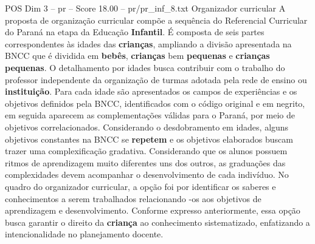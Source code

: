 \begin{textsample}{POS Dim 3 – pr – Score 18.00 – pr/pr\_inf\_8.txt}
Organizador curricular A proposta de organização curricular compõe a sequência do Referencial Curricular do Paraná na etapa da Educação \textbf{Infantil}.
É composta de seis partes correspondentes às idades das \textbf{crianças}, ampliando a divisão apresentada na BNCC que é dividida em \textbf{bebês}, \textbf{crianças} bem \textbf{pequenas} e \textbf{crianças} \textbf{pequenas}.
O detalhamento por idades busca contribuir com o trabalho do professor independente da organização de turmas adotada pela rede de ensino ou \textbf{instituição}.
Para cada idade são apresentados os campos de experiências e os objetivos definidos pela BNCC, identificados com o código original e em negrito, em seguida aparecem as complementações válidas para o Paraná, por meio de objetivos correlacionados.
Considerando o desdobramento em idades, alguns objetivos constantes na BNCC se \textbf{repetem} e os objetivos elaborados buscam trazer uma complexificação gradativa.
Considerando que os alunos possuem ritmos de aprendizagem muito diferentes uns dos outros, as graduações das complexidades devem acompanhar o desenvolvimento de cada indivíduo.
No quadro do organizador curricular, a opção foi por identificar os saberes e conhecimentos a serem trabalhados relacionando -os aos objetivos de aprendizagem e desenvolvimento.
Conforme expresso anteriormente, essa opção busca garantir o direito da \textbf{criança} ao conhecimento sistematizado, enfatizando a intencionalidade no planejamento docente.

\end{textsample}
